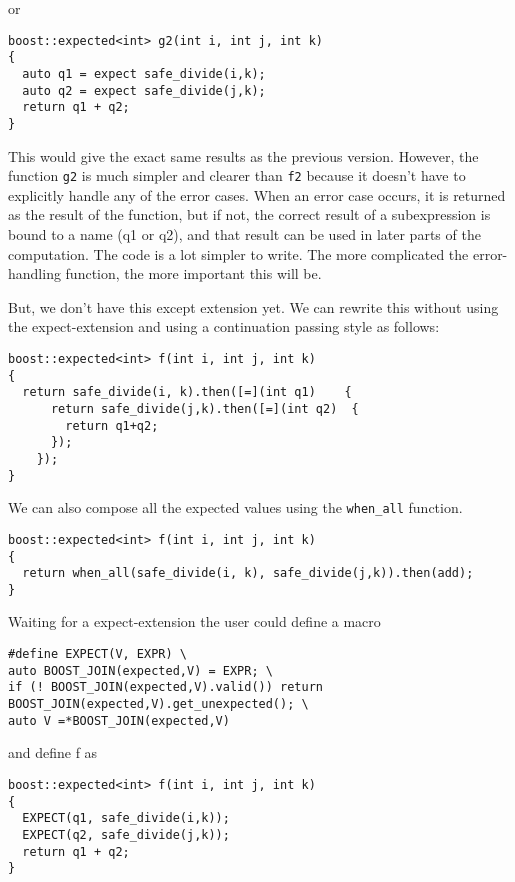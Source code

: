 \documentclass[a4paper,10pt]{article}
\newcommand{\cpp}[1]{\lstinline{#1}}
\begin{document}
or 

\begin{lstlisting}
boost::expected<int> g2(int i, int j, int k)
{
  auto q1 = expect safe_divide(i,k);
  auto q2 = expect safe_divide(j,k);
  return q1 + q2;
}
\end{lstlisting}

This would give the exact same results as the previous version. However, the function \cpp{g2} is much simpler and clearer than \cpp{f2} because it doesn't have to explicitly handle any of the error cases. When an error case occurs, it is returned as the result of the function, but if not, the correct result of a subexpression is bound to a name (q1 or q2), and that result can be used in later parts of the computation. The code is a lot simpler to write. The more complicated the error-handling function, the more important this will be.

But, we don't have this except extension yet. We can rewrite this without using the expect-extension and using a continuation passing style as follows:

\begin{lstlisting}
boost::expected<int> f(int i, int j, int k)
{
  return safe_divide(i, k).then([=](int q1)    {
      return safe_divide(j,k).then([=](int q2)  {
        return q1+q2;
      });
    });
}
\end{lstlisting}

We can also compose all the expected values using the \cpp{when_all} function.

\begin{lstlisting}
boost::expected<int> f(int i, int j, int k)
{
  return when_all(safe_divide(i, k), safe_divide(j,k)).then(add);
}
\end{lstlisting}


Waiting for a expect-extension the user could define a macro

\begin{lstlisting}
#define EXPECT(V, EXPR) \
auto BOOST_JOIN(expected,V) = EXPR; \
if (! BOOST_JOIN(expected,V).valid()) return BOOST_JOIN(expected,V).get_unexpected(); \
auto V =*BOOST_JOIN(expected,V)
\end{lstlisting}

and define f as

\begin{lstlisting}
boost::expected<int> f(int i, int j, int k)
{
  EXPECT(q1, safe_divide(i,k));
  EXPECT(q2, safe_divide(j,k));
  return q1 + q2;
}
\end{lstlisting}
\end{document}
